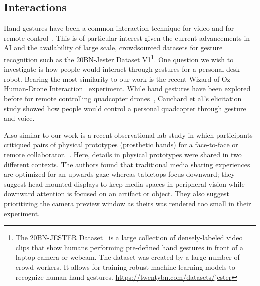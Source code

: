 \documentclass{tufte-handout}
\begin{document}
\subsection{Interactions}
Hand gestures have been a common interaction technique for video and
for remote control~\cite{Dezfuli:2012:PIP:2325616.2325623}.  This is
of particular interest given the current advancements in AI and the
availability of large scale, crowdsourced datasets for gesture
recognition such as the 20BN-Jester Dataset V1\footnote{The
  20BN-JESTER Dataset \ccbyncnd\ is a large collection of
  densely-labeled video clips that show humans performing pre-defined
  hand gestures in front of a laptop camera or webcam. The dataset was
  created by a large number of crowd workers. It allows for training
  robust machine learning models to recognize human hand
  gestures. \url{https://twentybn.com/datasets/jester}}. One question
we wish to investigate is how people would interact through gestures
for a personal desk robot.  Bearing the most similarity to our work is
the recent Wizard-of-Oz Human-Drone
Interaction~\cite{Cauchard:2015:DME:2750858.2805823} experiment. While
hand gestures have been explored before for remote controlling
quadcopter drones~\cite{Stoica:2014:RCQ:2559636.2559853}, Cauchard et
al.'s elicitation study showed how people would control a personal
quadcopter through gesture and voice.

Also similar to our work is a recent observational lab study in
which participants critiqued pairs of physical prototypes (prosthetic
hands) for a face-to-face or remote
collaborator.~\cite{Mok:2017:CPP:3064663.3064722}. Here, details in
physical prototypes were shared in two different contexts. The authors
found that traditional media sharing experiences are optimized for an
upwards gaze whereas tabletops focus downward; they suggest
head-mounted displays to keep media spaces in peripheral vision while
downward attention is focused on an artifact or object.  They also
suggest prioritizing the camera preview window as theirs was
rendered too small in their experiment.
\end{document}
